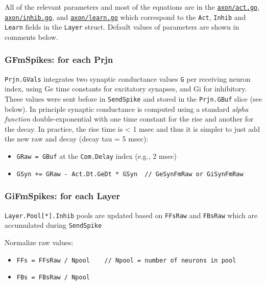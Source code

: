 \documentclass[11pt,twoside]{article}
\newif\myifpdf
\begin{document}
All of the relevant parameters and most of the equations are in the
\href{https://github.com/emer/axon/blob/master/axon/act.go}{\texttt{axon/act.go}},
\href{https://github.com/emer/axon/blob/master/axon/inhib.go}{\texttt{axon/inhib.go}},
and
\href{https://github.com/emer/axon/blob/master/axon/learn.go}{\texttt{axon/learn.go}}
which correspond to the \texttt{Act}, \texttt{Inhib} and \texttt{Learn}
fields in the \texttt{Layer} struct. Default values of parameters are
shown in comments below.

\hypertarget{gfmspikes-for-each-prjn}{%
\subsubsection{GFmSpikes: for each Prjn}\label{gfmspikes-for-each-prjn}}

\texttt{Prjn.GVals} integrates two synaptic conductance values
\texttt{G} per receiving neuron index, using Ge time constants for
excitatory synapses, and Gi for inhibitory. These values were sent
before in \texttt{SendSpike} and stored in the \texttt{Prjn.GBuf} slice
(see below). In principle synaptic conductance is computed using a
standard \emph{alpha function} double-exponential with one time constant
for the rise and another for the decay. In practice, the rise time is
\textless{} 1 msec and thus it is simpler to just add the new raw and
decay (decay tau = 5 msec):

\begin{itemize}
\tightlist
\item
  \texttt{GRaw\ =\ GBuf} at the \texttt{Com.Delay} index (e.g., 2 msec)
\item
  \texttt{GSyn\ +=\ GRaw\ -\ Act.Dt.GeDt\ *\ GSyn\ \ //\ GeSynFmRaw\ or\ GiSynFmRaw}
\end{itemize}

\hypertarget{gifmspikes-for-each-layer}{%
\subsubsection{GiFmSpikes: for each
Layer}\label{gifmspikes-for-each-layer}}

\texttt{Layer.Pool{[}*{]}.Inhib} pools are updated based on
\texttt{FFsRaw} and \texttt{FBsRaw} which are accumulated during
\texttt{SendSpike}

Normalize raw values:

\begin{itemize}
\tightlist
\item
  \texttt{FFs\ =\ FFsRaw\ /\ Npool\ \ \ \ //\ Npool\ =\ number\ of\ neurons\ in\ pool}
\item
  \texttt{FBs\ =\ FBsRaw\ /\ Npool}
\end{itemize}
\end{document}

